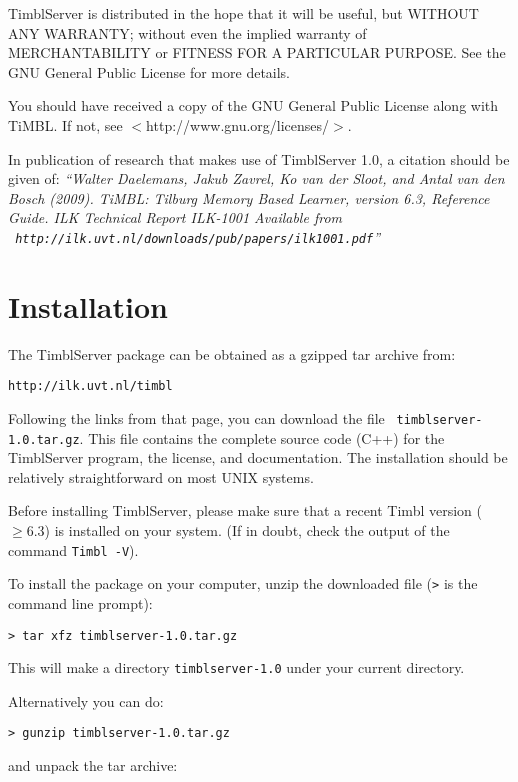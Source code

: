 \documentclass{report}
\begin{document}
TimblServer is distributed in the hope that it will be useful, but WITHOUT ANY WARRANTY; without even the implied warranty of MERCHANTABILITY or FITNESS FOR A PARTICULAR PURPOSE.  See the GNU General Public License for more details.

You should have received a copy of the GNU General Public License along with TiMBL.  If not, see $<$http://www.gnu.org/licenses/$>$.

In publication of research that makes use of TimblServer 1.0, a citation should be given of: {\em ``Walter Daelemans, Jakub Zavrel, Ko van der
  Sloot, and Antal van den Bosch (2009). TiMBL: Tilburg Memory Based
  Learner, version 6.3, Reference Guide. ILK Technical Report ILK-1001
  Available from \\ {\tt
    http://ilk.uvt.nl/downloads/pub/papers/ilk1001.pdf}''}

\pagestyle{headings}

\chapter{Installation}


\vspace{-1cm}
The TimblServer package can be obtained as a gzipped tar archive from:

{\tt http://ilk.uvt.nl/timbl}

Following the links from that page, you can download the file {\tt
  timblserver-1.0.tar.gz}. This file contains the complete source code
(C++) for the TimblServer program, the license, and documentation. The
installation should be relatively straightforward on most UNIX
systems.

Before installing TimblServer, please make sure that a recent Timbl
version ($\geq 6.3$) is installed on your system. (If in doubt, check
the output of the command {\tt Timbl -V}).

To install the package on your computer, unzip the downloaded file ({\tt >} is the command line prompt):

{\tt > tar xfz timblserver-1.0.tar.gz}

This will make a directory {\tt timblserver-1.0} under your current directory.

Alternatively you can do:

{\tt > gunzip timblserver-1.0.tar.gz}

and unpack the tar archive:
\end{document}
